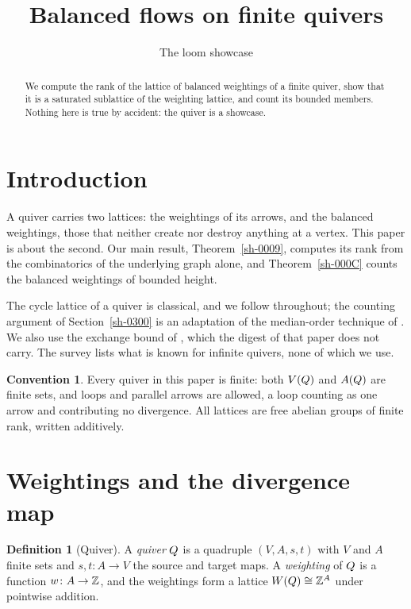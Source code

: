 \documentclass[11pt]{amsart}
\title{Balanced flows on finite quivers}
\author{The loom showcase}
\theoremstyle{plain}
\theoremstyle{definition}
\newtheorem{definition}[theorem]{Definition}
\newtheorem{convention}[theorem]{Convention}
\theoremstyle{remark}
\begin{document}
\maketitle

\begin{abstract}
We compute the rank of the lattice of balanced weightings of a finite quiver, show that it is a saturated sublattice of the weighting lattice, and count its bounded members. Nothing here is true by accident: the quiver is a showcase.
\end{abstract}

\section{Introduction}\label{sh-0100}

A quiver carries two lattices: the weightings of its arrows, and the balanced weightings, those that neither create nor destroy anything at a vertex. This paper is about the second. Our main result, Theorem~\ref{sh-0009}, computes its rank from the combinatorics of the underlying graph alone, and Theorem~\ref{sh-000C} counts the balanced weightings of bounded height.

The cycle lattice of a quiver is classical, and we follow \cite[Proposition 2.1]{Arden24} throughout; the counting argument of Section~\ref{sh-0300} is an adaptation of the median-order technique of \cite[Theorem 2.3]{Bellamy19}. We also use the exchange bound of \cite[Lemma 5.9]{Arden24}, which the digest of that paper does not carry. The survey \cite{Cortez07} lists what is known for infinite quivers, none of which we use.

\begin{convention}\label{sh-0001}
Every quiver in this paper is finite: both $V(Q)$ and $A(Q)$ are finite sets, and loops and parallel arrows are allowed, a loop counting as one arrow and contributing no divergence. All lattices are free abelian groups of finite rank, written additively.
\end{convention}


\section{Weightings and the divergence map}\label{sh-0200}

\begin{definition}[Quiver]\label{sh-0002}
A \emph{quiver} $Q$ is a quadruple $(V, A, s, t)$ with $V$ and $A$ finite sets and $s, t \colon A \to V$ the source and target maps. A \emph{weighting} of $Q$ is a function $w \colon A \to \mathbb{Z}$, and the weightings form a lattice $W(Q) \cong \mathbb{Z}^{A}$ under pointwise addition.
\end{definition}
\end{document}
